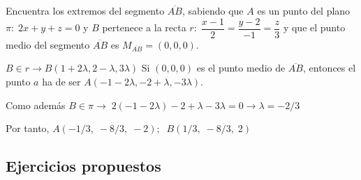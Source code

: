\begin{ejre}
Encuentra los extremos del segmento $\overline{AB}$, sabiendo	que $A$ es un punto del plano $\pi:\; 2x+y+z=0$ y $B$ pertenece a la recta $r:\; \dfrac{x-1}{2}= \dfrac{y-2}{-1}= \dfrac{z}{3}$ y que el punto medio del segmento $\overline{AB}$ es $M_{\overline{AB}}=(0,0,0)$.
\end{ejre}

\begin{proofw}\renewcommand{\qedsymbol}{$\diamond$}
	$B\in r \to B(1+2\lambda, 2-\lambda,3\lambda)$ Si $(0,0,0)$ es el punto medio de $\overline{AB}$, entonces el punto $a$ ha de ser $A(-1-2\lambda,-2+\lambda,-3\lambda)$. 
	
\noindent Como además $B\in \pi \to \; 2(-1-2\lambda)-2+\lambda-3\lambda=0 \to \lambda=-2/3$
	
\noindent Por tanto, $A(-1/3,\; -8/3, \; -2); \; \; B(1/3,\;-8/3,\; 2)$ 
\end{proofw}



\subsection{Ejercicios propuestos}


